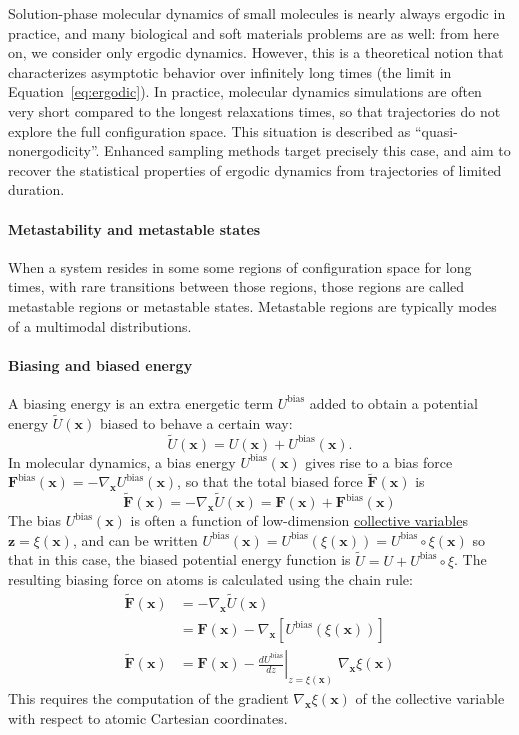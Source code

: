 \documentclass[9pt,review]{livecoms}
\newcommand{\vx}{\mathbf{x}}
\newcommand{\vz}{\mathbf{z}}
\newcommand{\vF}{\mathbf{F}}
\begin{document}
Solution-phase molecular dynamics of small molecules is nearly always ergodic in practice, and many biological and soft materials problems are as well: from here on, we consider only ergodic dynamics.
However, this is a theoretical notion that characterizes asymptotic behavior over infinitely long times (the limit in Equation~\ref{eq:ergodic}).
In practice, molecular dynamics simulations are often very short compared to the longest relaxations times, so that trajectories do not explore the full configuration space.
This situation is described as ``quasi-nonergodicity''.
Enhanced sampling methods target precisely this case, and aim to recover the statistical properties of ergodic dynamics from trajectories of limited duration.

\paragraph{Metastability and metastable states}
When a system resides in some some regions of configuration space for long times, with rare transitions between those regions, those regions are called metastable regions or metastable states. Metastable regions are typically modes of a multimodal distributions.

\hypertarget{ref:biasingE} {\paragraph{Biasing and biased energy}}
A biasing energy is an extra energetic term $U^\mathrm{bias}$ added to obtain a potential energy $\tilde{U}(\vx)$ biased to behave a certain way:
\begin{equation}
\tilde{U}(\vx) =  U(\vx) + U^\mathrm{bias}(\vx).
\end{equation}
In molecular dynamics, a bias energy
$U^\mathrm{bias}(\vx)$ gives rise to a bias force $\vF^\mathrm{bias}(\vx) = -\nabla_{\vx} U^\mathrm{bias}(\vx)$, so that the total biased force $\tilde{\vF}(\vx)$ is
\begin{equation}
\tilde{\vF}(\vx) = -\nabla_{\vx} \tilde U(\vx) = \vF(\vx) + \vF^\mathrm{bias}(\vx)
\end{equation}
The bias $U^\mathrm{bias}(\vx)$ is often a function of low-dimension \hyperlink{ref:CV} {collective variable}s $\vz = \xi(\vx)$, and can be written $U^\mathrm{bias}(\vx) = U^\mathrm{bias}(\xi(\vx)) = U^\mathrm{bias}\circ \xi(\vx)$ so that in this case, the biased potential energy function is $\tilde U= U + U^\mathrm{bias}\circ \xi$.
The resulting biasing force on atoms is calculated using the chain rule:
\begin{align}
\tilde{\vF}(\vx) &= -\nabla_{\vx} \tilde U(\vx) \\
&= \vF(\vx) -\nabla_{\vx} [ U^\mathrm{bias}(\xi(\vx))]\\
\tilde{\vF}(\vx)&= \vF(\vx) - \left . \frac{dU^\mathrm{bias}}{dz}\right |_{z=\xi(\vx)} \; \nabla_{\vx}\xi(\vx)
\end{align}
This requires the computation of the gradient $\nabla_{\vx}\xi(\vx)$ of the collective variable with respect to atomic Cartesian coordinates.
\end{document}
